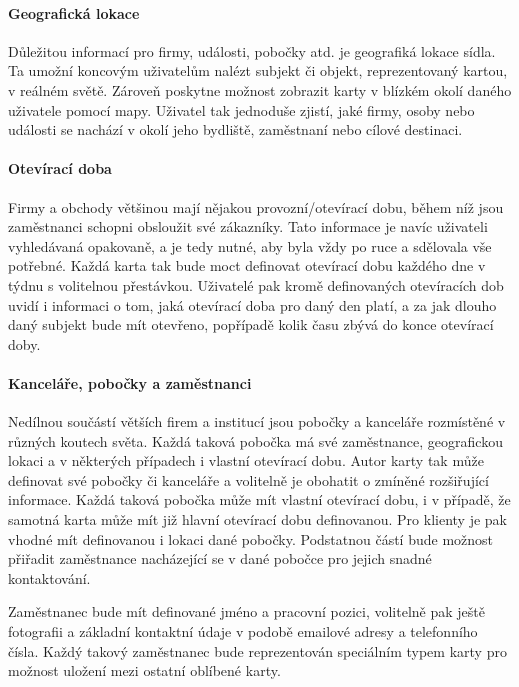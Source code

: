 	\paragraph{Geografická lokace}

	Důležitou informací pro firmy, události, pobočky atd. je geografiká lokace sídla.
	Ta umožní koncovým uživatelům nalézt subjekt či objekt, reprezentovaný kartou, v reálném světě.
	Zároveň poskytne možnost zobrazit karty v blízkém okolí daného uživatele pomocí mapy.
	Uživatel tak jednoduše zjistí, jaké firmy, osoby nebo události se nachází v okolí jeho bydliště, zaměstnaní nebo
	cílové destinaci.

	\paragraph{Otevírací doba}

	Firmy a obchody většinou mají nějakou provozní/otevírací dobu, během níž jsou zaměstnanci schopni obsloužit své zákazníky.
	Tato informace je navíc uživateli vyhledávaná opakovaně, a je tedy nutné, aby byla vždy po ruce a sdělovala vše potřebné.
	Každá karta tak bude moct definovat otevírací dobu každého dne v týdnu s volitelnou přestávkou.
	Uživatelé pak kromě definovaných otevíracích dob uvidí i informaci o tom, jaká otevírací doba pro daný den platí,
	a za jak dlouho daný subjekt bude mít otevřeno, popřípadě kolik času zbývá do konce otevírací doby.

	\paragraph{Kanceláře, pobočky a zaměstnanci}

	Nedílnou součástí větších firem a institucí jsou pobočky a kanceláře rozmístěné v různých koutech světa.
	Každá taková pobočka má své zaměstnance, geografickou lokaci a v některých případech i vlastní otevírací dobu.
	Autor karty tak může definovat své pobočky či kanceláře a volitelně je obohatit o zmíněné rozšiřující informace.
	Každá taková pobočka může mít vlastní otevírací dobu, i v případě, že samotná karta může mít již hlavní otevírací dobu
	definovanou.
	Pro klienty je pak vhodné mít definovanou i lokaci dané pobočky.
	Podstatnou částí bude možnost přiřadit zaměstnance nacházející se v dané pobočce pro jejich snadné kontaktování.

	Zaměstnanec bude mít definované jméno a pracovní pozici, volitelně pak ještě fotografii a základní kontaktní údaje
	v podobě emailové adresy a telefonního čísla.
	Každý takový zaměstnanec bude reprezentován speciálním typem karty pro možnost uložení mezi
	ostatní oblíbené karty.

